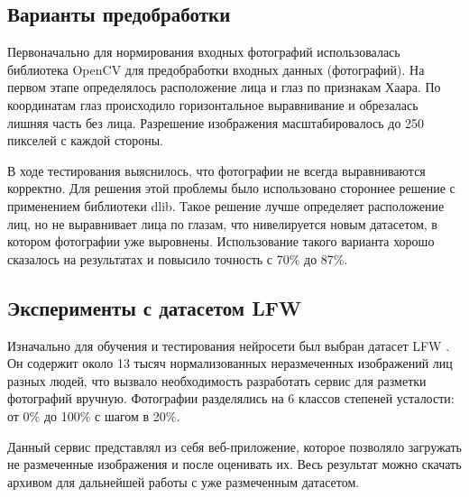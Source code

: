 \documentclass[12pt, letterpaper]{article}
\begin{document}
\subsection{Варианты предобработки}
    Первоначально для нормирования входных фотографий использовалась библиотека OpenCV для предобработки входных данных (фотографий). На первом этапе определялось расположение лица и глаз по признакам Хаара. По координатам глаз происходило горизонтальное выравнивание и обрезалась лишняя часть без лица. Разрешение изображения масштабировалось до 250 пикселей с каждой стороны.
    
    В ходе тестирования выяснилось, что фотографии не всегда выравниваются корректно. Для решения этой проблемы было использовано стороннее решение с применением библиотеки dlib. Такое решение лучше определяет расположение лиц, но не выравнивает лица по глазам, что нивелируется новым датасетом, в котором фотографии уже выровнены. Использование такого варианта хорошо сказалось на результатах и повысило точность с 70\% до 87\%.


\subsection{Эксперименты с датасетом LFW}

    Изначально для обучения и тестирования нейросети был выбран датасет LFW \cite{kawulok_advances_2016}. Он содержит около 13 тысяч нормализованных неразмеченных изображений лиц разных людей, что вызвало необходимость разработать сервис для разметки фотографий вручную. Фотографии разделялись на 6 классов степеней усталости: от 0\% до 100\% с шагом в 20\%.
    
    Данный сервис \cite{bairamovazat_bairamovazatneuralsetstorage_2021} представлял из себя веб-приложение, которое позволяло загружать не размеченные изображения и после оценивать их. Весь результат можно скачать архивом для дальнейшей работы с уже размеченным датасетом.
    
\end{document}
